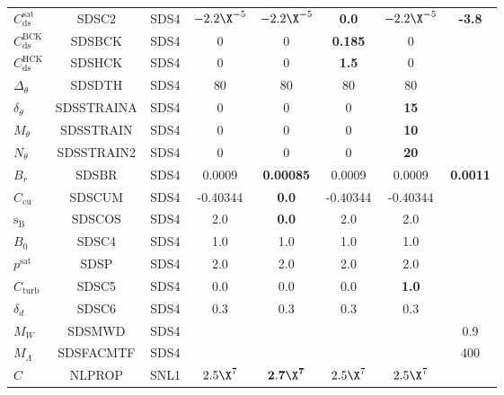 \begin{landscape}
\begin{table}
\begin{center}
\begin{tabular}{|l|c|c|c|c|c|c|c|}
  $C_{\mathrm{ds}}^{\mathrm{sat}}$ & SDSC2         & SDS4      &$-2.2\X^{-5}$&$-2.2\X^{-5}$     &\textbf{0.0}  &$-2.2\X^{-5}$&  \textbf{-3.8}  \\
  $C_{\mathrm{ds}}^{\mathrm{BCK}}$ & SDSBCK        & SDS4      & 0           & 0                &\textbf{0.185}& 0           & \\
  $C_{\mathrm{ds}}^{\mathrm{HCK}}$ & SDSHCK        & SDS4      & 0           & 0                &\textbf{1.5}  & 0           & \\
  $\Delta_\theta$                  & SDSDTH        & SDS4      & 80          & 80               & 80           &  80         & \\
  $\delta_\theta$                  & SDSSTRAINA    & SDS4      & 0           & 0                & 0            & \textbf{15} &    \\
  $M_\theta$                       & SDSSTRAIN     & SDS4      & 0           & 0                & 0            & \textbf{10} &    \\
  $N_\theta$                       & SDSSTRAIN2    & SDS4      & 0           & 0                & 0            & \textbf{20} &    \\
  $B_r$                            & SDSBR         & SDS4      & 0.0009      &\textbf{0.00085}  & 0.0009       & 0.0009      &  \textbf{0.0011}  \\
  $C_{\mathrm{cu}}$                & SDSCUM        & SDS4      & -0.40344    & \textbf{0.0}     &-0.40344      &-0.40344     & \\
  ${\mathrm{s_B}}$                 & SDSCOS        &SDS4       & 2.0         & \textbf{0.0}     & 2.0          & 2.0         & \\
   $B_0$                           & SDSC4         & SDS4      & 1.0         & 1.0              & 1.0          & 1.0         &  \\
  $p^{\mathrm{sat}}$               & SDSP          & SDS4      & 2.0         & 2.0              & 2.0          & 2.0         & \\
  $C_{\mathrm{turb}}$              & SDSC5         & SDS4      & 0.0         &  0.0             & 0.0          & \textbf{1.0}&  \\
  $\delta_d$                       & SDSC6         & SDS4      & 0.3         &  0.3             & 0.3          &0.3          & \\
  $ M_W$			   & SDSMWD	   & SDS4      &            &                   &              &             & 0.9 \\
  $ M_\Lambda$			   & SDSFACMTF	   & SDS4      &            &                   &              &             & 400 \\
  $C$                              & NLPROP        & SNL1      & $2.5\X^7$   &$\mathbf{2.7\X^7}$& $2.5\X^7$    & $2.5\X^7$   & \\
 \hline \hline
\end{tabular}  
\end{center}


\end{table}
\end{landscape}
